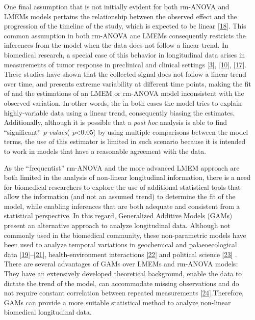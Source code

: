\documentclass[
]{article}
\begin{document}
One final assumption that is not initially evident for both rm-ANOVA and
LMEMs models pertains the relationship between the observed effect and
the progression of the timeline of the study, which is expected to be
linear {[}\protect\hyperlink{ref-pinheiro2006}{18}{]}. This common
assumption in both rm-ANOVA ane LMEMs consequently restricts the
inferences from the model when the data does not follow a linear trend.
In biomedical research, a special case of this behavior in longitudinal
data arises in measurements of tumor response in preclinical and
clinical settings {[}\protect\hyperlink{ref-roblyer2011}{3}{]},
{[}\protect\hyperlink{ref-skala2010}{10}{]},
{[}\protect\hyperlink{ref-vishwanath2009}{17}{]}. These studies have
shown that the collected signal does not follow a linear trend over
time, and presents extreme variability at different time points, making
the fit of and the estimations of an LMEM or rm-ANOVA model inconsistent
with the observed variation. In other words, the in both cases the model
tries to explain highly-variable data using a linear trend, consequently
biasing the estimates. Additionally, although it is possible that a
\emph{post hoc} analysis is able to find ``significant''
\emph{p-values}( \emph{p}\textless0.05) by using multiple comparisons
between the model terms, the use of this estimator is limited in such
scenario because it is intended to work in models that have a reasonable
agreement with the data.

As the ``frequentist'' rm-ANOVA and the more advanced LMEM approach are
both limited in the analysis of non-linear longitudinal information,
there is a need for biomedical researchers to explore the use of
additional statistical tools that allow the information (and not an
assumed trend) to determine the fit of the model, while enabling
inferences that are both adequate and consistent from a statistical
perspective. In this regard, Generalized Additive Models (GAMs) present
an alternative approach to analyze longitudinal data. Although not
commonly used in the biomedical community, these non-parametric models
have been used to analyze temporal variations in geochemical and
palaeoecological data
{[}\protect\hyperlink{ref-rose2012}{19}{]}--{[}\protect\hyperlink{ref-simpson2018}{21}{]},
health-environment interactions
{[}\protect\hyperlink{ref-yang2012}{22}{]} and political science
{[}\protect\hyperlink{ref-beck1998}{23}{]} . There are several
advantages of GAMs over LMEMs and rm-ANOVA models: They have an
extensively developed theoretical background, enable the data to dictate
the trend of the model, can accommodate missing observations and do not
require constant correlation between repeated measurements
{[}\protect\hyperlink{ref-wood2017}{24}{]}.Therefore, GAMs can provide a
more suitable statistical method to analyze non-linear biomedical
longitudinal data.
\end{document}
